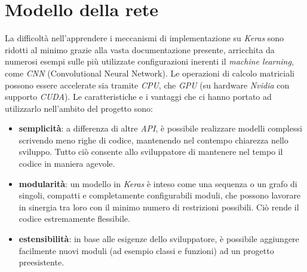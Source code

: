 \section{Modello della rete}
La difficoltà nell’apprendere i meccanismi di implementazione su \textit{Keras} sono ridotti al minimo grazie alla vasta documentazione presente, arricchita da numerosi esempi sulle più utilizzate configurazioni inerenti il \textit{machine learning}, come \textit{CNN} (Convolutional Neural Network).
Le operazioni di calcolo matriciali possono essere accelerate sia tramite \textit{CPU}, che \textit{GPU} (su hardware \textit{Nvidia} con supporto \textit{CUDA}).
Le caratteristiche e i vantaggi che ci hanno portato ad utilizzarlo nell’ambito del progetto sono:
\begin{itemize}
	\item \textbf{semplicità}: a differenza di altre \textit{API}, è possibile realizzare modelli complessi scrivendo meno righe di codice, mantenendo nel contempo chiarezza nello sviluppo. Tutto ciò consente allo sviluppatore di mantenere nel tempo il codice in maniera agevole.
	\item \textbf{modularità}: un modello in \textit{Keras} è inteso come una sequenza o un grafo di singoli, compatti e completamente configurabili moduli, che possono lavorare in sinergia tra loro con il minimo numero di restrizioni possibili. Ciò rende il codice estremamente flessibile.
	\item \textbf{estensibilità}: in base alle esigenze dello sviluppatore, è possibile aggiungere facilmente nuovi moduli (ad esempio classi e funzioni) ad un progetto preesistente.
\end{itemize}
